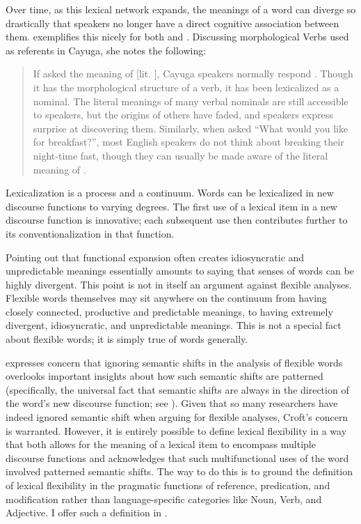 Over time, as this lexical network expands, the meanings of a word can diverge so drastically that speakers no longer have a direct cognitive association between them. \citeauthor{Mithun2000} exemplifies this nicely for both  and . Discussing morphological Verbs used as referents in Cayuga, she notes the following:

\blockquote[{\cite[413]{Mithun2000}}]{If asked the meaning of  [lit. ], Cayuga speakers normally respond . Though it has the morphological structure of a verb, it has been lexicalized as a nominal. The literal meanings of many verbal nominals are still accessible to speakers, but the origins of others have faded, and speakers express surprise at discovering them. Similarly, when asked \enquote{What would you like for breakfast?}, most English speakers do not think about breaking their night-time fast, though they can usually be made aware of the literal meaning of .}

\noindent Lexicalization is a process and a continuum. Words can be lexicalized in new discourse functions to varying degrees. The first use of a lexical item in a new discourse function is innovative; each subsequent use then contributes further to its conventionalization in that function.

Pointing out that functional expansion often creates idiosyncratic and unpredictable meanings essentially amounts to saying that senses of words can be highly divergent. This point is not in itself an argument against flexible analyses. Flexible words themselves may sit anywhere on the continuum from having closely connected, productive and predictable meanings, to having extremely divergent, idiosyncratic, and unpredictable meanings. This is not a special fact about flexible words; it is simply true of words generally.

\textcite[73]{Croft2001b} expresses concern that ignoring semantic shifts in the analysis of flexible words overlooks important insights about how such semantic shifts are patterned (specifically, the universal fact that semantic shifts are always in the direction of the word's new discourse function; see ). Given that so many researchers have indeed ignored semantic shift when arguing for flexible analyses, Croft's concern is warranted. However, it is entirely possible to define lexical flexibility in a way that both allows for the meaning of a lexical item to encompass multiple discourse functions and acknowledges that such multifunctional uses of the word involved patterned semantic shifts. The way to do this is to ground the definition of lexical flexibility in the pragmatic functions of reference, predication, and modification rather than language-specific categories like Noun, Verb, and Adjective. I offer such a definition in .

